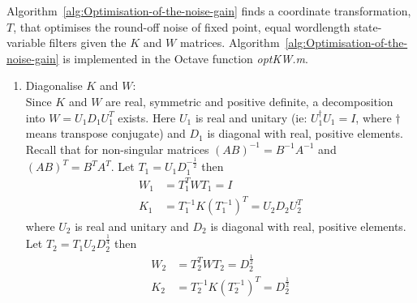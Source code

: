 \documentclass[a4paper,twoside,10pt,english]{report}
\begin{document}
Algorithm~\ref{alg:Optimisation-of-the-noise-gain} finds a coordinate 
transformation, $T$, that optimises the round-off noise of fixed point, 
equal wordlength state-variable filters given the $K$ and $W$ matrices. 
Algorithm~\ref{alg:Optimisation-of-the-noise-gain} is implemented in the
Octave function \emph{optKW.m}.
\begin{algorithm}[!hptb]
\begin{enumerate}
\item Diagonalise $K$ and $W$:\\
Since $K$ and $W$ are real, symmetric and positive definite, a decomposition
into $W=U_{1}D_{1}U_{1}^{T}$ exists. Here $U_{1}$ is real and unitary (ie:
$U_{1}^{\dagger} U_{1}=I$, where $\dagger$ means transpose conjugate) 
and $D_{1}$ is diagonal with real, positive elements. Recall that for
non-singular matrices $\left(AB\right)^{-1}=B^{-1}A^{-1}$ and 
$\left(AB\right)^{T}=B^{T}A^{T}$. Let $T_{1}=U_{1}D_{1}^{-\frac{1}{2}}$
then
\begin{align*}
  W_{1}&=T_{1}^{T}WT_{1}=I \\
  K_{1}&=T_{1}^{-1}K\left(T_{1}^{-1}\right)^{T}=U_{2}D_{2}U_{2}^{T}
\end{align*}
where $U_{2}$ is real and unitary and $D_{2}$ is diagonal
with real, positive elements. Let $T_{2}=T_{1}U_{2}D_{2}^{\frac{1}{4}}$
then
\begin{align*}
W_{2}&=T_{2}^{T}WT_{2}=D_{2}^{\frac{1}{2}} \\
K_{2}&=T_{2}^{-1}K\left(T_{2}^{-1}\right)^{T}=D_{2}^{\frac{1}{2}}
\end{align*}


\end{enumerate}
\end{algorithm}
\end{document}
